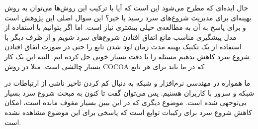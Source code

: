 حال ایده‌ای که مطرح می‌شود این است که آیا با ترکیب این روش‌ها می‌توان به روش‌ بهینه‌ای برای مدیریت شروع‌های سرد رسید یا خیر؟‌ این سوال اصلی این پژوهش است و برای پاسخ به آن به مطالعه‌ی خیلی بیشتری نیاز است. اما اگر بتوانیم با استفاده از مدل پیشگیری مناسب مانع اتقاق افتادن شروع‌های سرد شویم و از ظرف دیگر با استفاده از یک تکنیک بهینه مدت زمان لود شدن تابع را حتی در صورت اتفاق افتادن شروع سرد کاهش بدهیم مسئله را با دقت بسیار خوبی حل کرده ایم. البته این یک کار بسیار چالشی است. مثلا در روش COCOA که در \cite{gias2020cocoa} ما باید برای هر تابع 

ما همواره در مهندسی نرم‌افزار و شبکه به دنبال کم کردن تاخیر ناشی از ارتباطات در شبکه و سرور با کاربران هسنیم. پس می‌توان گفت تا کنون به مبحث شروع سرد بسیار بی‌توجهی شده است. موضوع دیگری که در این بیین بسیار مغوف مانده است، امکان کاهش شروع سرد برای رکیبات توابع است که پاسخی برای این موضوع مشاهده نشده است. 




